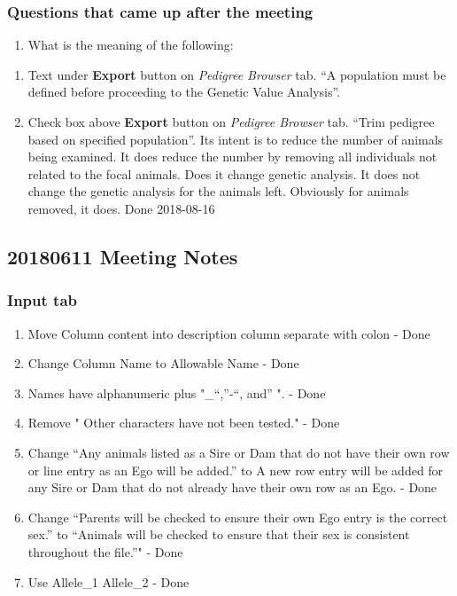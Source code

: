 \documentclass[
]{article}
\providecommand{\tightlist}{%
  \setlength{\itemsep}{0pt}\setlength{\parskip}{0pt}}
\begin{document}
\hypertarget{questions-that-came-up-after-the-meeting}{%
\subsubsection{Questions that came up after the
meeting}\label{questions-that-came-up-after-the-meeting}}

\begin{enumerate}
\def\labelenumi{\arabic{enumi}.}
\tightlist
\item
  What is the meaning of the following:
\end{enumerate}

\begin{enumerate}
\def\labelenumi{\alph{enumi}.}
\tightlist
\item
  Text under \textbf{Export} button on \emph{Pedigree Browser} tab. ``A
  population must be defined before proceeding to the Genetic Value
  Analysis''.
\item
  Check box above \textbf{Export} button on \emph{Pedigree Browser} tab.
  ``Trim pedigree based on specified population''. Its intent is to
  reduce the number of animals being examined. It does reduce the number
  by removing all individuals not related to the focal animals. Does it
  change genetic analysis. It does not change the genetic analysis for
  the animals left. Obviously for animals removed, it does. Done
  2018-08-16
\end{enumerate}

\hypertarget{meeting-notes-1}{%
\subsection{20180611 Meeting Notes}\label{meeting-notes-1}}

\hypertarget{input-tab}{%
\subsubsection{Input tab}\label{input-tab}}

\begin{enumerate}
\def\labelenumi{\arabic{enumi}.}
\tightlist
\item
  Move Column content into description column separate with colon - Done
\item
  Change Column Name to Allowable Name - Done
\item
  Names have alphanumeric plus "\_``,''-``, and'' ". - Done
\item
  Remove " Other characters have not been tested." - Done
\item
  Change ``Any animals listed as a Sire or Dam that do not have their
  own row or line entry as an Ego will be added.'' to A new row entry
  will be added for any Sire or Dam that do not already have their own
  row as an Ego. - Done
\item
  Change ``Parents will be checked to ensure their own Ego entry is the
  correct sex.'' to ``Animals will be checked to ensure that their sex
  is consistent throughout the file.''" - Done
\item
  Use Allele\_1 Allele\_2 - Done
\end{enumerate}
\end{document}
